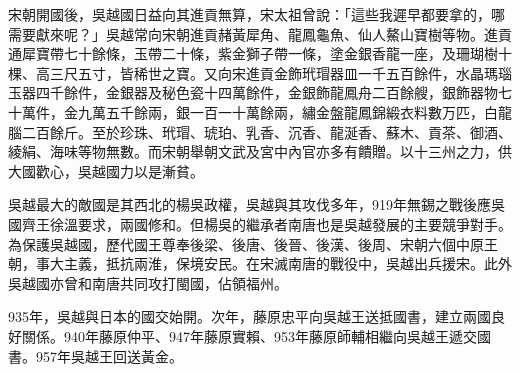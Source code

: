 宋朝開國後，吳越國日益向其進貢無算，宋太祖曾說：「這些我遲早都要拿的，哪需要獻來呢？」吳越常向宋朝進貢赭黃犀角、龍鳳龜魚、仙人鰲山寶樹等物。進貢通犀寶帶七十餘條，玉帶二十條，紫金獅子帶一條，塗金銀香龍一座，及珊瑚樹十棵、高三尺五寸，皆稀世之寶。又向宋進貢金飾玳瑁器皿一千五百餘件，水晶瑪瑙玉器四千餘件，金銀器及秘色瓷十四萬餘件，金銀飾龍鳳舟二百餘艘，銀飾器物七十萬件，金九萬五千餘兩，銀一百一十萬餘兩，繡金盤龍鳳錦緞衣料數万匹，白龍腦二百餘斤。至於珍珠、玳瑁、琥珀、乳香、沉香、龍涎香、蘇木、貢茶、御酒、綾絹、海味等物無數。而宋朝舉朝文武及宮中內官亦多有饋贈。以十三州之力，供大國歡心，吳越國力以是漸貧。

吳越最大的敵國是其西北的楊吳政權，吳越與其攻伐多年，919年無錫​​之戰後應吳國齊王徐溫要求，兩國修和。但楊吳的繼承者南唐也是吳越發展的主要競爭對手。為保護吳越國，歷代國王尊奉後梁、後唐、後晉、後漢、後周、宋朝六個中原王朝，事大主義，抵抗兩淮，保境安民。在宋滅南唐的戰役中，吳越出兵援宋。此外吳越國亦曾和南唐共同攻打閩國，佔領福州。

935年，吳越與日本的國交始開。次年，藤原忠平向吳越王送抵國書，建立兩國良好關係。940年藤原仲平、947年藤原實賴、953年藤原師輔相繼向吳越王遞交國書。957年吳越王回送黃金。








